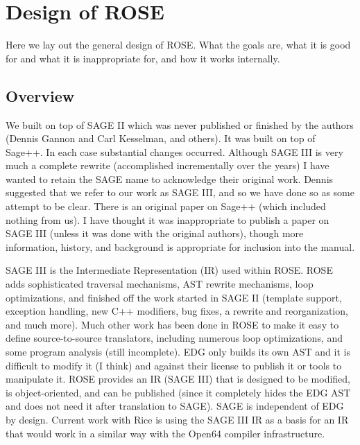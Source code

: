 
\chapter{ Design of ROSE }
   Here we lay out the general design of ROSE.  What the goals are, what it is
good for and what it is inappropriate for, and how it works internally.

\section{Overview}
   We built on top of SAGE II which was never published or finished by the authors
(Dennis Gannon and Carl Kesselman, and others).  It was built on top of
Sage++.  In each case substantial changes occurred.  Although SAGE III
is very much a complete rewrite (accomplished incrementally over the years)
I have wanted to retain the SAGE name to acknowledge their original work.
Dennis suggested that we refer to our work as SAGE III, and so we
have done so as some attempt to be clear.  There is an original paper on Sage++
(which included nothing from us).  I have thought it was inappropriate
to publish a paper on SAGE III (unless it was done with the original authors),
though more information, history, and background is appropriate for inclusion 
into the manual.

   SAGE III is the Intermediate Representation (IR) used within ROSE.  
ROSE adds sophisticated traversal mechanisms, AST rewrite mechanisms, loop
optimizations, and finished off the work started in SAGE II (template support, exception
handling, new C++ modifiers, bug fixes, a rewrite and reorganization, and much more).
Much other work has 
been done in ROSE to make it easy to define source-to-source translators, including 
numerous loop optimizations, and some program analysis (still incomplete).
EDG only builds its own AST and it is difficult to modify it (I think)
and against their license to publish it or tools to manipulate it.  ROSE provides
an IR (SAGE III) that is designed to be modified, is object-oriented, and can be published
(since it completely hides the EDG AST and does not need it after translation to
SAGE).  SAGE is independent of EDG by design. Current work with Rice is using the 
SAGE III IR as a basis for an IR that would work in a similar way with the 
Open64 compiler infrastructure.

